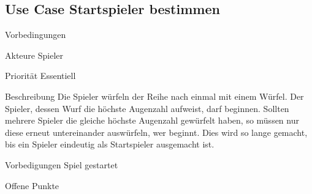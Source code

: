 \subsection{Use Case Startspieler bestimmen}
\begin{labeling}[:]{Vorbedingungen}
\item [Akteure] Spieler
\item [Priorität] Essentiell
\item [Beschreibung] Die Spieler würfeln der Reihe nach einmal mit einem Würfel. Der Spieler, dessen Wurf die höchste Augenzahl aufweist, darf beginnen. Sollten mehrere Spieler die gleiche höchste Augenzahl gewürfelt haben, so müssen nur diese erneut untereinander auswürfeln, wer beginnt. Dies wird so lange gemacht, bis ein Spieler eindeutig als Startspieler ausgemacht ist.
\item [Vorbedigungen] Spiel gestartet
\item [Offene Punkte]
\end{labeling}

